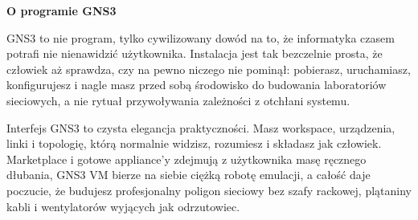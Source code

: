 \documentclass[10pt,a5paper,twoside]{article}
\begin{document}
\vspace{4mm}
\noindent\textbf{O programie GNS3}\par
\noindent GNS3 to nie program, tylko cywilizowany dowód na to, że informatyka czasem potrafi nie nienawidzić użytkownika. Instalacja jest tak bezczelnie prosta, że człowiek aż sprawdza, czy na pewno niczego nie pominął: pobierasz, uruchamiasz, konfigurujesz i nagle masz przed sobą środowisko do budowania laboratoriów sieciowych, a nie rytuał przywoływania zależności z otchłani systemu.

\noindent Interfejs GNS3 to czysta elegancja praktyczności. Masz workspace, urządzenia, linki i topologię, którą normalnie widzisz, rozumiesz i składasz jak człowiek. Marketplace i gotowe appliance'y zdejmują z użytkownika masę ręcznego dłubania, GNS3 VM bierze na siebie ciężką robotę emulacji, a całość daje poczucie, że budujesz profesjonalny poligon sieciowy bez szafy rackowej, plątaniny kabli i wentylatorów wyjących jak odrzutowiec.

\vspace*{4mm}
\clearpage
\nopagecolor
\end{document}
